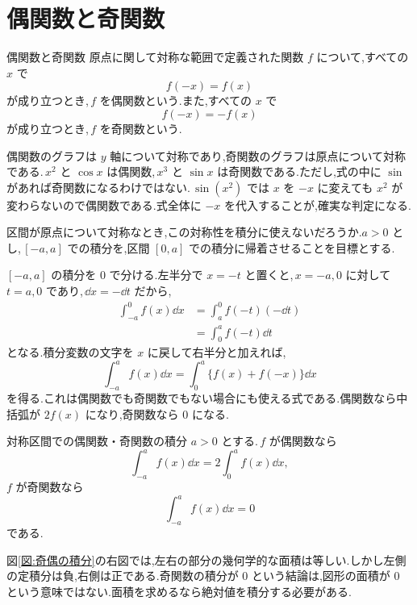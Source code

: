 \section{偶関数と奇関数}\label{節:奇偶の対称性}

\begin{definition}{偶関数と奇関数}
原点に関して対称な範囲で定義された関数 $f$ について,すべての $x$ で
\[
f(-x)=f(x)
\]
が成り立つとき,\,$f$ を偶関数という.また,すべての $x$ で
\[
f(-x)=-f(x)
\]
が成り立つとき,\,$f$ を奇関数という.
\end{definition}

偶関数のグラフは $y$ 軸について対称であり,奇関数のグラフは原点について対称である.\,$x^2$ と $\cos x$ は偶関数,\,$x^3$ と $\sin x$ は奇関数である.ただし,式の中に $\sin$ があれば奇関数になるわけではない.\,$\sin(x^2)$ では $x$ を $-x$ に変えても $x^2$ が変わらないので偶関数である.式全体に $-x$ を代入することが,確実な判定になる.

区間が原点について対称なとき,この対称性を積分に使えないだろうか.$a>0$ とし,\,$[-a,a]$ での積分を,区間 $[0,a]$ での積分に帰着させることを目標とする.

$[-a,a]$ の積分を $0$ で分ける.左半分で $x=-t$ と置くと,\,$x=-a,0$ に対して $t=a,0$ であり,\,$\dd x=-\dd t$ だから,
\[
\begin{aligned}
\int_{-a}^{0}f(x)\dd x
 &=\int_a^0 f(-t)(-\dd t)\\
 &=\int_0^a f(-t)\dd t
\end{aligned}
\]
となる.積分変数の文字を $x$ に戻して右半分と加えれば,
\begin{equation}\label{式:左右の積分}
\int_{-a}^a f(x)\dd x
 =\int_0^a\{f(x)+f(-x)\}\dd x
\end{equation}
を得る.これは偶関数でも奇関数でもない場合にも使える式である.偶関数なら中括弧が $2f(x)$ になり,奇関数なら $0$ になる.

\begin{theorem}{対称区間での偶関数・奇関数の積分}
$a>0$ とする.\,$f$ が偶関数なら
\[
\int_{-a}^a f(x)\dd x=2\int_0^a f(x)\dd x,
\]
$f$ が奇関数なら
\[
\int_{-a}^a f(x)\dd x=0
\]
である.
\end{theorem}

図\ref{図:奇偶の積分}の右図では,左右の部分の幾何学的な面積は等しい.しかし左側の定積分は負,右側は正である.奇関数の積分が $0$ という結論は,図形の面積が $0$ という意味ではない.面積を求めるなら絶対値を積分する必要がある.

